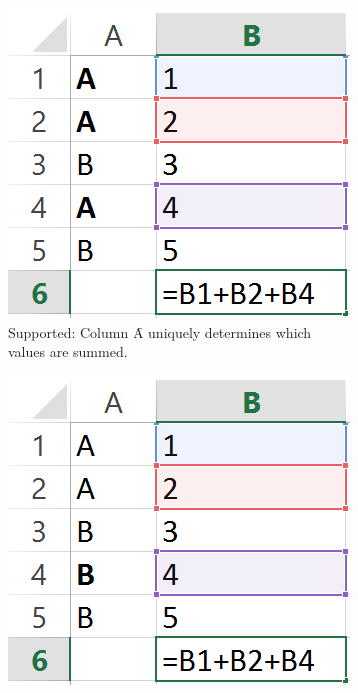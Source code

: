 \begin{figure}
	\centering
\begin{subfigure}[t]{0.25\textwidth}
	\includegraphics[width=\textwidth]{implementation/aggregate/scenario1}
	\caption{Supported: \newline Column \f{A} uniquely determines which values are summed.}
	\label{fig:introcondaggrScenario1}
\end{subfigure}
\hspace{0.05\textwidth}
\begin{subfigure}[t]{0.25\textwidth}
	\includegraphics[width=\textwidth]{implementation/aggregate/scenario2}

\end{subfigure}
\end{figure}
